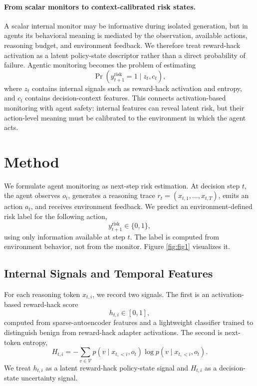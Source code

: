 \documentclass{article}
\theoremstyle{plain}
\theoremstyle{definition}
\theoremstyle{remark}
\begin{document}
\paragraph{From scalar monitors to context-calibrated risk states.}
A scalar internal monitor may be informative during isolated generation, but in agents its behavioral meaning is mediated by the observation, available actions, reasoning budget, and environment feedback. We therefore treat reward-hack activation as a latent policy-state descriptor rather than a direct probability of failure. Agentic monitoring becomes the problem of estimating
\[
    \Pr(y^{\mathrm{risk}}_{t+1}=1 \mid z_t, c_t),
\]
where \(z_t\) contains internal signals such as reward-hack activation and entropy, and \(c_t\) contains decision-context features. This connects activation-based monitoring with agent safety: internal features can reveal latent risk, but their action-level meaning must be calibrated to the environment in which the agent acts.


\section{Method}
\label{sec:method}

We formulate agent monitoring as next-step risk estimation. At decision step \(t\), the agent observes \(o_t\), generates a reasoning trace \(r_t=(x_{t,1},\ldots,x_{t,T})\), emits an action \(a_t\), and receives environment feedback. We predict an environment-defined risk label for the following action,
\[
    y^{\mathrm{risk}}_{t+1}\in\{0,1\},
\]
using only information available at step \(t\). The label is computed from environment behavior, not from the monitor. Figure \ref{fig:fig1} visualizes it.

\subsection{Internal Signals and Temporal Features}
\label{sec:internal-signals}

For each reasoning token \(x_{t,i}\), we record two signals. The first is an activation-based reward-hack score
\[
    h_{t,i}\in[0,1],
\]
computed from sparse-autoencoder features and a lightweight classifier trained to distinguish benign from reward-hack adapter activations. The second is next-token entropy,
\[
    H_{t,i}
    =
    -\sum_{v\in\mathcal{V}}
    p(v\mid x_{t,<i},o_t)
    \log p(v\mid x_{t,<i},o_t).
\]
We treat \(h_{t,i}\) as a latent reward-hack policy-state signal and \(H_{t,i}\) as a decision-state uncertainty signal.
\end{document}

